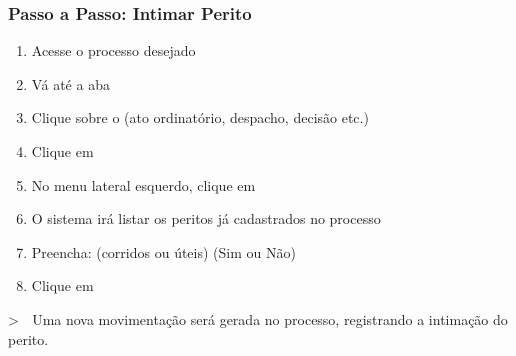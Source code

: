 \documentclass[letterpaper,10pt,brazil]{sphinxmanual}
\begin{document}
\subsubsection{Passo a Passo: Intimar Perito}
\label{\detokenize{projud_34_intimarperitooj:passo-a-passo-intimar-perito}}\begin{enumerate}
%
\item {} 
\sphinxAtStartPar
Acesse o processo desejado

\item {} 
\sphinxAtStartPar
Vá até a aba 

\item {} 
\sphinxAtStartPar
Clique sobre o  (ato ordinatório, despacho, decisão etc.)

\item {} 
\sphinxAtStartPar
Clique em 

\item {} 
\sphinxAtStartPar
No menu lateral esquerdo, clique em 

\item {} 
\sphinxAtStartPar
O sistema irá listar os peritos já cadastrados no processo

\item {} 
\sphinxAtStartPar
Preencha:
\sphinxhyphen{}  (corridos ou úteis)
\sphinxhyphen{}  (Sim ou Não)

\item {} 
\sphinxAtStartPar
Clique em 

\end{enumerate}

\sphinxAtStartPar
\textgreater{} 📌 Uma nova movimentação será gerada no processo, registrando a intimação do perito.
\end{document}
